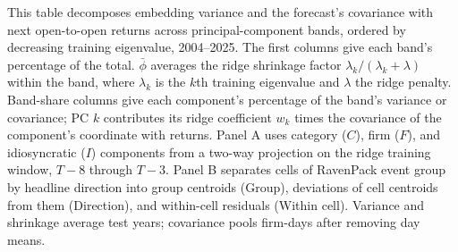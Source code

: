 \begin{table}[htbp]
\centering
\caption{Variance and Predictive Covariance by Principal-Component Band}
\label{tab:tabA_spectrum}
\begin{minipage}{\linewidth}\footnotesize
This table decomposes embedding variance and the forecast's covariance with next open-to-open returns across principal-component bands, ordered by decreasing training eigenvalue, 2004--2025. The first columns give each band's percentage of the total. $\bar\phi$ averages the ridge shrinkage factor $\lambda_k/(\lambda_k+\lambda)$ within the band, where $\lambda_k$ is the $k$th training eigenvalue and $\lambda$ the ridge penalty. Band-share columns give each component's percentage of the band's variance or covariance; PC $k$ contributes its ridge coefficient $w_k$ times the covariance of the component's coordinate with returns. Panel A uses category ($C$), firm ($F$), and idiosyncratic ($I$) components from a two-way projection on the ridge training window, $T-8$ through $T-3$. Panel B separates cells of RavenPack event group by headline direction into group centroids (Group), deviations of cell centroids from them (Direction), and within-cell residuals (Within cell). Variance and shrinkage average test years; covariance pools firm-days after removing day means.
\end{minipage}
\medskip


\end{table}
